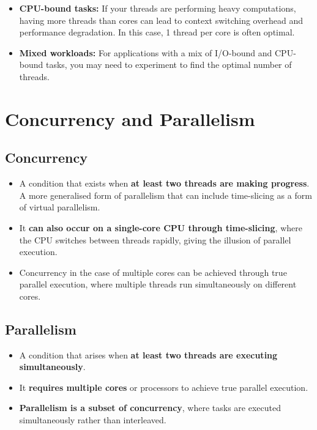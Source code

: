 \documentclass{article}
\begin{document}
\begin{itemize}
\begin{itemize}
\begin{itemize}
      \item \textbf{CPU-bound tasks:} If your threads are performing heavy computations, having more threads than cores can lead to context switching overhead and performance degradation. In this case, 1 thread per core is often optimal.
      \item \textbf{Mixed workloads:} For applications with a mix of I/O-bound and CPU-bound tasks, you may need to experiment to find the optimal number of threads.
    \end{itemize}
  \end{itemize}
\end{itemize}

\section{Concurrency and Parallelism}
\subsection{Concurrency}
\begin{itemize}
  \item A condition that exists when \textbf{at least two threads are making progress}. A more generalised form of parallelism that can include time-slicing as a form of virtual parallelism.
  \item It \textbf{can also occur on a single-core CPU through time-slicing}, where the CPU switches between threads rapidly, giving the illusion of parallel execution.
  \item Concurrency in the case of multiple cores can be achieved through true parallel execution, where multiple threads run simultaneously on different cores.
\end{itemize}
\subsection{Parallelism}
\begin{itemize}
  \item A condition that arises when \textbf{at least two threads are executing simultaneously}.
  \item It \textbf{requires multiple cores} or processors to achieve true parallel execution.
  \item \textbf{Parallelism is a subset of concurrency}, where tasks are executed simultaneously rather than interleaved.
\end{itemize}
\newpage
\printindex
\end{document}
